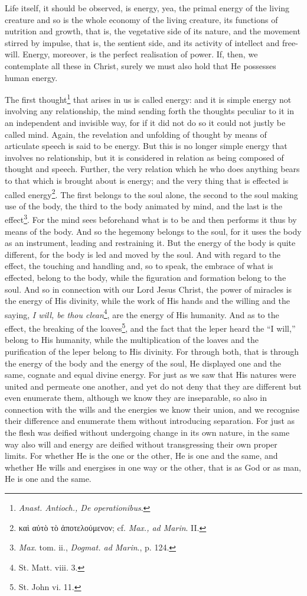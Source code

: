 Life itself, it should be observed, is energy, yea, the primal energy of the living creature and so is the whole economy of the living creature, its functions of nutrition and growth, that is, the vegetative side of its nature, and the movement stirred by impulse, that is, the sentient side, and its activity of intellect and free-will. Energy, moreover, is the perfect realisation of power. If, then, we contemplate all these in Christ, surely we must also hold that He possesses human energy.

The first thought\footnote{\emph{Anast. Antioch., De operationibus}.} that arises in us is called energy: and it is simple energy not involving any relationship, the mind sending forth the thoughts peculiar to it in an independent and invisible way, for if it did not do so it could not justly be called mind. Again, the revelation and unfolding of thought by means of articulate speech is said to be energy. But this is no longer simple energy that involves no relationship, but it is considered in relation as being composed of thought and speech. Further, the very relation which he who does anything bears to that which is brought about is energy; and the very thing that is effected is called energy\footnote{\textgreek{καὶ αὐτὸ τὸ ἀποτελούμενον}; cf. \emph{Max., ad Marin}. II.}. The first belongs to the soul alone, the second to the soul making use of the body, the third to the body animated by mind, and the last is the effect\footnote{\emph{Max}. tom. ii., \emph{Dogmat. ad Marin}., p. 124.}. For the mind sees beforehand what is to be and then performs it thus by means of the body. And so the hegemony belongs to the soul, for it uses the body as an instrument, leading and restraining it. But the energy of the body is quite different, for the body is led and moved by the soul. And with regard to the effect, the touching and handling and, so to speak, the embrace of what is effected, belong to the body, while the figuration and formation belong to the soul. And so in connection with our Lord Jesus Christ, the power of miracles is the energy of His divinity, while the work of His hands and the willing and the saying, \emph{I will, be thou clean}\footnote{St. Matt. viii. 3.}, are the energy of His humanity. And as to the effect, the breaking of the loaves\footnote{St. John vi. 11.}, and the fact that the leper heard the “I will,” belong to His humanity, while the multiplication of the loaves and the purification of the leper belong to His divinity. For through both, that is through the energy of the body and the energy of the soul, He displayed one and the same, cognate and equal divine energy. For just as we saw that His natures were united and permeate one another, and yet do not deny that they are different but even enumerate them, although we know they are inseparable, so also in connection with the wills and the energies we know their union, and we recognise their difference and enumerate them without introducing separation. For just as the flesh was deified without undergoing change in its own nature, in the same way also will and energy are deified without transgressing their own proper limits. For whether He is the one or the other, He is one and the same, and whether He wills and energises in one way or the other, that is as God or as man, He is one and the same.

